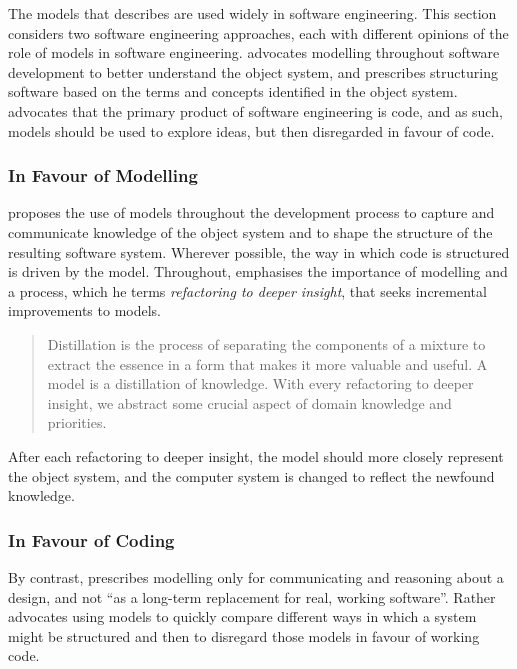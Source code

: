 The models that \cite{jackson95software} describes are used widely in software engineering. This section considers two software engineering approaches, each with  different opinions of the role of models in software engineering. \cite{evans04domain} advocates modelling throughout software development to better understand the object system, and prescribes structuring software based on the terms and concepts identified in the object system. \cite{martin06agile} advocates that the primary product of software engineering is code, and as such, models should be used to explore ideas, but then disregarded in favour of code.

\subsubsection{In Favour of Modelling}
\cite{evans04domain} proposes the use of models throughout the development process to capture and communicate knowledge of the object system and to shape the structure of the resulting software system. Wherever possible, the way in which code is structured is driven by the model. Throughout, \cite{evans04domain} emphasises the importance of modelling and a process, which he terms \emph{refactoring to deeper insight}, that seeks incremental improvements to models.

\begin{quote}
Distillation is the process of separating the components of a mixture to extract the essence in a form that makes it more valuable and useful. A model is a distillation of knowledge. With every refactoring to deeper insight, we abstract some crucial aspect of domain knowledge and priorities. \cite[pg397]{evans04domain}
\end{quote}

After each refactoring to deeper insight, the model should more closely represent the object system, and the computer system is changed to reflect the newfound knowledge. 

\subsubsection{In Favour of Coding}
By contrast, \cite[ch14]{martin06agile} prescribes modelling only for communicating and reasoning about a design, and not ``as a long-term replacement for real, working software''. Rather \cite{martin06agile} advocates using models to quickly compare different ways in which a system might be structured and then to disregard those models in favour of working code.


